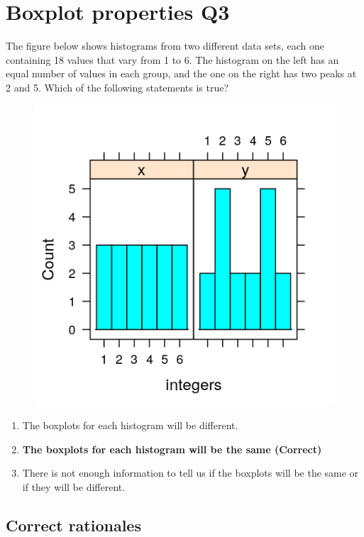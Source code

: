 \documentclass[letterpaper,9pt,twoside,printwatermark=false]{pinp}
\providecommand{\tightlist}{%
  \setlength{\itemsep}{0pt}\setlength{\parskip}{0pt}}
\begin{document}
\section{Boxplot properties Q3}\label{boxplot-properties-q3}

The figure below shows histograms from two different data sets, each one
containing 18 values that vary from 1 to 6. The histogram on the left
has an equal number of values in each group, and the one on the right
has two peaks at 2 and 5. Which of the following statements is true?

\begin{figure}
\centering
\includegraphics{hist.png}
\caption{}
\end{figure}

\begin{enumerate}
\def\labelenumi{\alph{enumi})}
\tightlist
\item
  The boxplots for each histogram will be different.
\item
  \textbf{The boxplots for each histogram will be the same (Correct)}
\item
  There is not enough information to tell us if the boxplots will be the
  same or if they will be different.
\end{enumerate}

\subsection{Correct rationales}\label{correct-rationales-2}
\end{document}
